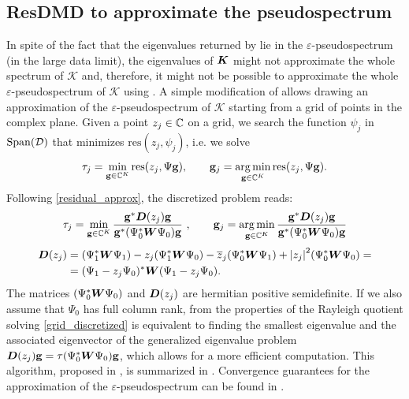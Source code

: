 \subsection{ResDMD to approximate the pseudospectrum}
In spite of the fact that the eigenvalues returned by  lie in the $\varepsilon$-pseudospectrum (in the large data limit), the eigenvalues of $\vb*{K}$ might not approximate the whole spectrum of $\mathcal{K}$ and, therefore, it might not be possible to approximate the whole $\varepsilon$-pseudospectrum of $\mathcal{K}$ using . A simple modification of  allows drawing an approximation of the $\varepsilon$-pseudospectrum of $\mathcal{K}$ starting from a grid of points in the complex plane. Given a point $z_j\in\mathbb{C}$ on a grid, we search the function $\psi_j$ in $\mathrm{Span}(\mathcal{D})$ that minimizes $\mathrm{res}(z_j, \psi_j)$, i.e. we solve
\begin{equation}
    \label{grid_continuous}
    \tau_j = \min_{\vb{g}\in\mathbb{C}^K} \mathrm{res}(z_j, \Psi\vb{g}), \qquad \vb{g}_j = \operatorname*{arg\,min}_{\vb{g}\in\mathbb{C}^K} \mathrm{res}(z_j, \Psi\vb{g}).
\end{equation}
Following \eqref{residual_approx}, the discretized problem reads:
\begin{equation}
    \label{grid_discretized}
    \tau_j = \min_{\vb{g}\in\mathbb{C}^K} \frac{\vb{g}^*\vb*{D}(z_j)\vb{g}}{\vb{g}^*(\Psi_0^*\vb*{W}\Psi_0)\vb{g}}\,\,, \qquad \vb{g}_j = \operatorname*{arg\,min}_{\vb{g}\in\mathbb{C}^K} \frac{\vb{g}^*\vb*{D}(z_j)\vb{g}}{\vb{g}^*(\Psi_0^*\vb*{W}\Psi_0)\vb{g}}
\end{equation}
\begin{equation}
    \label{D(z)_definition}
    \begin{split}
        \vb*{D}(z_j) &= (\Psi_1^*\vb*{W}\Psi_1) - z_j (\Psi_1^*\vb*{W}\Psi_0) - \overline{z}_j(\Psi_0^*\vb*{W}\Psi_1) + \abs{z_j}^2 (\Psi_0^*\vb*{W}\Psi_0) =\\ 
        & = (\Psi_1 - z_j\Psi_0)^*\vb*{W}(\Psi_1 - z_j\Psi_0).
    \end{split}
\end{equation}
The matrices $(\Psi_0^*\vb*{W}\Psi_0)$ and $\vb*{D}(z_j)$ are hermitian positive semidefinite. If we also assume that $\Psi_0$ has full column rank, from the properties of the Rayleigh quotient solving \eqref{grid_discretized} is equivalent to finding the smallest eigenvalue and the associated eigenvector of the generalized eigenvalue problem $\vb*{D}(z_j)\vb{g} = \tau(\Psi_0^*\vb*{W}\Psi_0)\vb{g}$, which allows for a more efficient computation. This algorithm, proposed in \cite{colbrook_rigorous_2021}, is summarized in . Convergence guarantees for the approximation of the $\varepsilon$-pseudospectrum can be found in \cite{colbrook_rigorous_2021}.

